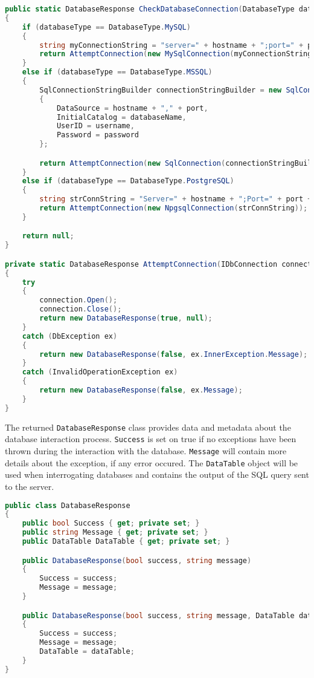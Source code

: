 \begin{lstlisting}[language=csharp, caption={The CheckDatabaseConnection() method that tries to initiate a connection with a specific database server based on user-defined parameters}]
public static DatabaseResponse CheckDatabaseConnection(DatabaseType databaseType, string hostname, int port, string databaseName,  string username, string password)
{
    if (databaseType == DatabaseType.MySQL)
    {
        string myConnectionString = "server=" + hostname + ";port=" + port + ";database=" + databaseName + ";uid=" + username + ";pwd=" + password + ";";
        return AttemptConnection(new MySqlConnection(myConnectionString));
    }
    else if (databaseType == DatabaseType.MSSQL)
    {
        SqlConnectionStringBuilder connectionStringBuilder = new SqlConnectionStringBuilder()
        {
            DataSource = hostname + "," + port,
            InitialCatalog = databaseName,
            UserID = username,
            Password = password
        };

        return AttemptConnection(new SqlConnection(connectionStringBuilder.ConnectionString));
    }
    else if (databaseType == DatabaseType.PostgreSQL)
    {
        string strConnString = "Server=" + hostname + ";Port=" + port + ";User Id=" + username + ";Password=" + password + ";Database=" + databaseName;
        return AttemptConnection(new NpgsqlConnection(strConnString));
    }

    return null;
}

private static DatabaseResponse AttemptConnection(IDbConnection connection)
{
    try
    {
        connection.Open();
        connection.Close();
        return new DatabaseResponse(true, null);
    }
    catch (DbException ex)
    {
        return new DatabaseResponse(false, ex.InnerException.Message);
    }
    catch (InvalidOperationException ex)
    {
        return new DatabaseResponse(false, ex.Message);
    }
}
\end{lstlisting}

The returned \texttt{DatabaseResponse} class provides data and metadata about the database interaction process. \texttt{Success} is set on true if no exceptions have been thrown during the interaction with the database. \texttt{Message} will contain more details about the exception, if any error occured. The \texttt{DataTable} object will be used when interrogating databases and contains the output of the SQL query sent to the server.

\begin{lstlisting}[language=csharp, caption={The DatabaseResponse class}]
public class DatabaseResponse
{
    public bool Success { get; private set; }
    public string Message { get; private set; }
    public DataTable DataTable { get; private set; }

    public DatabaseResponse(bool success, string message)
    {
        Success = success;
        Message = message;
    }

    public DatabaseResponse(bool success, string message, DataTable dataTable)
    {
        Success = success;
        Message = message;
        DataTable = dataTable;
    }
}
\end{lstlisting}

